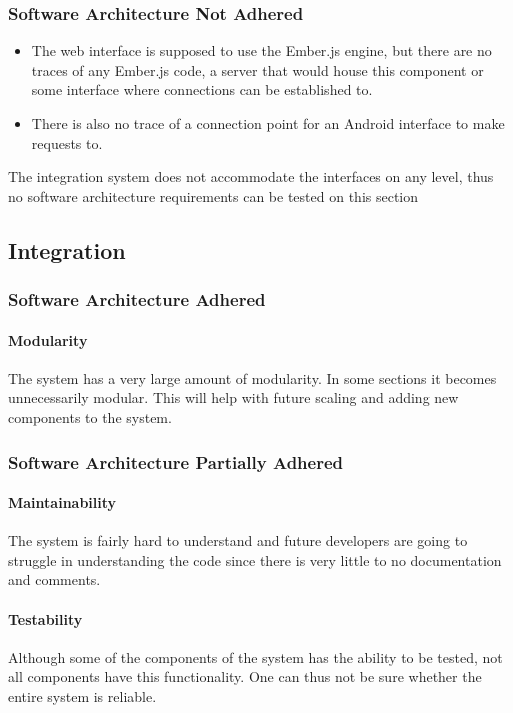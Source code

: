 \documentclass{article}
\begin{document}
		\subsubsection{Software Architecture Not Adhered}
			\begin{itemize}	
				\item The web interface is supposed to use the Ember.js engine, but there are no traces of any Ember.js code, a server that would house this component or some interface where connections can be established to.
				\item There is also no trace of a connection point for an Android interface to make requests to.
			\end{itemize}
			The integration system does not accommodate the interfaces on any level, thus no software architecture requirements can be tested on this section

	\subsection{Integration}
		\subsubsection{Software Architecture Adhered}
			\paragraph{Modularity} The system has a very large amount of modularity. In some sections it becomes unnecessarily modular. This will help with future scaling and adding new components to the system.
			
		\subsubsection{Software Architecture Partially Adhered}
			\paragraph{Maintainability} The system is fairly hard to understand and future developers are going to struggle in understanding the code since there is very little to no documentation and comments.
			\paragraph{Testability} Although some of the components of the system has the ability to be tested, not all components have this functionality. One can thus not be sure whether the entire system is reliable.			
			
\end{document}
